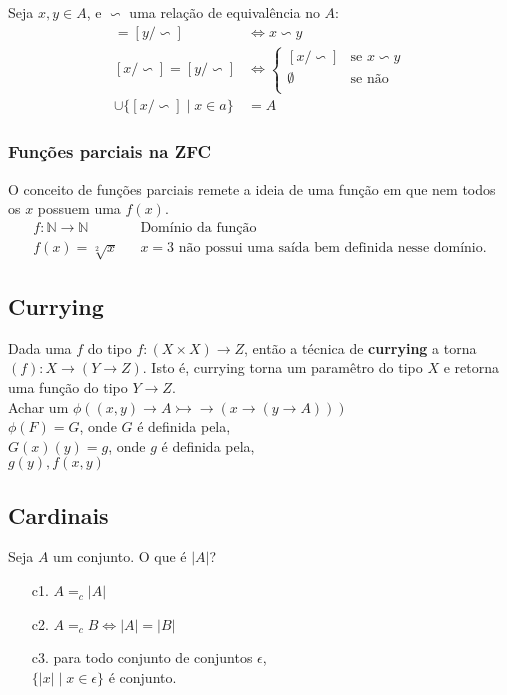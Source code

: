 \documentclass[12pt, a4paper]{article}
\begin{document}
Seja $x,y \in A$, e $\backsim$ uma relação de equivalência no $A$:
\begin{align*}
[x/\backsim] = [y/\backsim] &\iff x \backsim y\\
[x/\backsim] = [y/\backsim] &\iff
\begin{cases}
[x/\backsim] 	& \text{se } x \backsim y \\
\emptyset 		& \text{se não}\\
\end{cases}
\\
\cup\{[x/ \backsim] \mid x \in a \} &= A
\end{align*}

\subsubsection{Funções parciais na ZFC}
O conceito de funções parciais remete a ideia de uma função em que nem todos os $x$ possuem uma $f(x)$.
\begin{align*}
f: \mathbb{N} \to \mathbb{N} && \text{Domínio da função}\\
f(x) = \sqrt[2]{x} && x = 3 \text{ não possui uma saída bem definida nesse domínio.}
\end{align*}

\subsection{Currying}
Dada uma $f$ do tipo $f:(X \times X) \rightarrow Z$, então a técnica de \textbf{currying} a torna $(f): X \rightarrow (Y \rightarrow Z)$.
Isto é, currying torna um paramêtro do tipo $X$ e retorna uma função do tipo $Y \rightarrow Z$.\\


\noindent Achar um $\phi ( (x,y) \rightarrow A \rightarrowtail\!\!\!\!\!\rightarrow (x \rightarrow (y \rightarrow A)))$\\
$\phi(F) = G$, onde $G$ é definida pela,\\
$G(x)(y) = g$, onde $g$ é definida pela,\\
$g(y), f(x,y)$

\subsection{Cardinais}
Seja $A$ um conjunto. O que é $|A|$?
\begin{itemize}
\item[c1.] $A =_c |A|$
\item[c2.] $A =_c B \iff |A| = |B|$
\item[c3.] para todo conjunto de conjuntos $\epsilon$,\\
$\{|x| \mid x \in \epsilon \}$ é conjunto.
\end{itemize}
\end{document}
